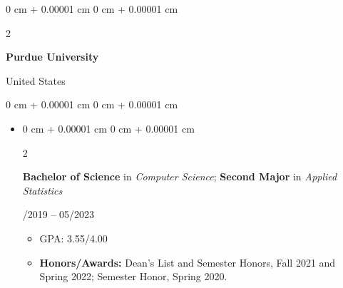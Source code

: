 \documentclass[10pt, letterpaper]{article}
\newenvironment{highlights}{
    \begin{itemize}[
        topsep=0.10 cm,
        parsep=0.10 cm,
        partopsep=0pt,
        itemsep=0pt,
        leftmargin=0 cm + 10pt
    ]
}{
    \end{itemize}
} %
\newenvironment{onecolentry}{
    \begin{adjustwidth}{
        0 cm + 0.00001 cm
    }{
        0 cm + 0.00001 cm
    }
}{
    \end{adjustwidth}
} %
\newenvironment{twocolentry}[2][]{
    \onecolentry
    \def\secondColumn{#2}
    \setcolumnwidth{\fill, 4.5 cm}
    \begin{paracol}{2}
}{
    \switchcolumn \raggedleft \secondColumn
    \end{paracol}
    \endonecolentry
} %
\begin{document}
\vspace{0.10 cm}

\begin{twocolentry}{
    United States
}
    \textbf{Purdue University}
\end{twocolentry}

\vspace{0.05 cm}
\begin{onecolentry}
    \begin{highlights}
        \item \begin{twocolentry}{
            01/2019 -- 05/2023
        }
            \textbf{Bachelor of Science} in \textit{Computer Science}; 
            \textbf{Second Major} in \textit{Applied Statistics}
        \end{twocolentry}
        \begin{highlights}
            \item GPA: 3.55/4.00
            \item \textbf{Honors/Awards:} Dean's List and Semester Honors, Fall 2021 and Spring 2022; Semester Honor, Spring 2020.
        \end{highlights}
    \end{highlights}
\end{onecolentry}
            
    

        
\end{document}
